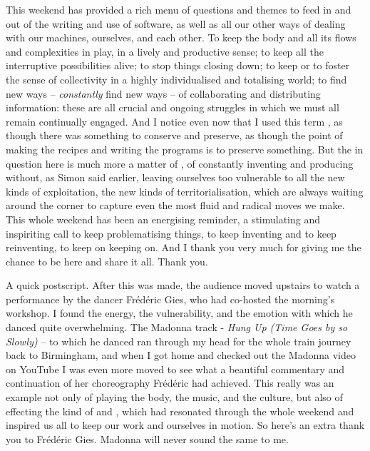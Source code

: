 {This weekend has provided a rich menu of questions and themes to feed in
and out of the writing and use of software, as well as all our other
ways of dealing with our machines, ourselves, and each other. To keep
the body and all its flows and complexities in play, in a lively and
productive sense; to keep all the interruptive possibilities alive; to
stop things closing down; to keep or to foster the sense of
collectivity in a highly individualised and totalising world; to find
new ways {--} {\em constantly} find new ways {--} of collaborating
and distributing information: these are all crucial and ongoing
struggles in which we must all remain continually engaged. And I notice
even now that I used this term , as though there was something
to conserve and preserve, as though the point of making the recipes and
writing the programs is to preserve something. But the  in
question here is much more a matter of , of constantly
inventing and producing without, as Simon said earlier, leaving
ourselves too vulnerable to all the new kinds of exploitation, the new
kinds of territorialisation, which are always waiting around the corner
to capture even the most fluid and radical moves we make. This whole
weekend has been an energising reminder, a stimulating and inspiriting
call to keep problematising things, to keep inventing and to keep
reinventing, to keep on keeping on. And I thank you very much for
giving me the chance to be here and share it all. Thank you. 

A quick postscript. After this  was made, the
audience moved upstairs to watch a performance by the dancer
Fr\'ed\'eric Gies, who had co{}-hosted the morning's workshop. I found
the energy, the vulnerability, and the emotion with which he danced
quite overwhelming. The Madonna track {}- {\em Hung Up (Time Goes by
so Slowly)} {--} to which he danced ran through my head for the whole
train journey back to Birmingham, and when I got home and checked out
the Madonna video on YouTube I was even more moved to see what a
beautiful commentary and continuation of her choreography Fr\'ed\'eric
had achieved. This really was an example not only of playing the body,
the music, and the culture, but also of effecting the kind of  and , which had resonated through the whole
weekend and inspired us all to keep our work and ourselves in motion.
So here's an extra thank you to Fr\'ed\'eric Gies. Madonna will never
sound the same to me.}
